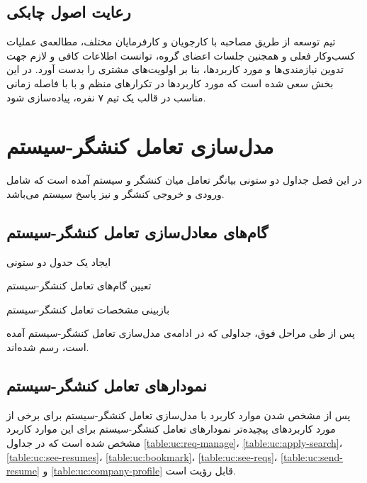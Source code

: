 \documentclass[12pt,svgnames,oneside]{book}
\newcounter{itemadded}
\let\LaTeXStandardEnumerateBegin\enumerate
\let\LaTeXStandardEnumerateEnd\endenumerate
\renewenvironment{enumerate}{%
\LaTeXStandardEnumerateBegin%
\setcounter{itemadded}{0}
}{%
\LaTeXStandardEnumerateEnd%
}%
\begin{document}
\section{رعایت اصول چابکی}
تیم توسعه از طریق مصاحبه با کارجویان و کارفرمایان مختلف، مطالعه‌ی عملیات کسب‌وکار فعلی و همجنین جلسات اعضای گروه، توانست اطلاعات کافی و لازم جهت تدوین نیاز‌مندی‌ها و مورد کاربر‌د‌ها، بنا بر اولویت‌های مشتری را بدست آورد. در این بخش سعی شده است که مورد کاربرد‌ها در تکرار‌های منظم و با با فاصله زمانی مناسب در قالب یک تیم ۷ نفره، پیاده‌سازی شود.

\chapter{مدل‌سازی تعامل کنشگر-سیستم}
در این فصل جداول دو‌ ستونی بیانگر تعامل میان کنشگر و سیستم آمده است که شامل ورودی و خروجی کنشگر و نیز پاسخ سیستم می‌باشد.


\section{گام‌های معادل‌سازی تعامل کنشگر-سیستم}
\begin{enumerate}
\item 
ایجاد یک حدول دو ستونی

\item 
تعیین گام‌های تعامل کنشگر-سیستم

\item 
بازبینی مشخصات تعامل کنشگر-سیستم
\end{enumerate}

پس از طی مراحل فوق، جداولی که در ادامه‌ی مدل‌سازی تعامل کنشگر-سیستم آمده‌ است، رسم شده‌اند.

\section{نمودار‌های تعامل کنشگر-سیستم}
پس از مشخص شدن موارد کاربرد با مدل‌سازی تعامل کنشگر-سیستم برای برخی از مورد‌ کاربرد‌های پیچیده‌تر نمودار‌های تعامل کنشگر-سیستم برای این موارد کاربرد مشخص شده است که در جداول 
\ref{table:uc:req-manage}،
\ref{table:uc:apply-search}،
\ref{table:uc:see-resumes}،
\ref{table:uc:bookmark}،
\ref{table:uc:see-reqs}،
\ref{table:uc:send-resume} و
\ref{table:uc:company-profile}
قابل رؤیت است.
\end{document}

